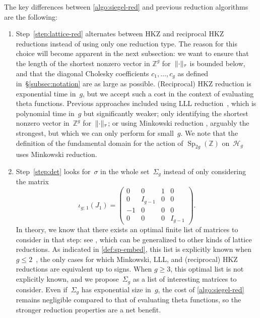 \documentclass[12pt,oneside]{amsart}
\numberwithin{equation}{section}
\theoremstyle{definition}
\newcommand{\Z}{\mathbb{Z}}
\newcommand{\Half}{\mathcal{H}}
\newcommand{\embedsp}[2]{\iota_{#1;\,#2}}
\DeclareMathOperator{\Sp}{Sp}
\DeclarePairedDelimiter{\norm}{\|}{\|}
\begin{document}
The key differences between \cref{algo:siegel-red} and previous reduction
algorithms are the following:
\begin{enumerate}
\item Step~\eqref{step:lattice-red} alternates between HKZ and reciprocal HKZ
  reductions instead of using only one reduction type. The reason for this
  choice will become apparent in the next subsection: we want to ensure that
  the length of the shortest nonzero vector in $\mathbb{Z}^g$
  for~$\norm{\cdot}_\tau$ is bounded below, and that the diagonal Cholesky
  coefficients $c_1,\ldots,c_g$ as defined in~§\ref{subsec:notation} are as
  large as possible. (Reciprocal) HKZ reduction is exponential time in~$g$, but
  we accept such a cost in the context of evaluating theta functions. Previous
  approaches included using LLL
  reduction~\cite{lenstraFactoringPolynomialsRational1982}, which is polynomial
  time in~$g$ but significantly weaker; only identifying the shortest nonzero
  vector in~$\Z^g$ for~$\norm{\cdot}_\tau$; or using Minkowski reduction
  \cite{minkowskiDiskontinuitatsbereichFurArithmetische1905}, arguably the
  strongest, but which we can only perform for small~$g$. We note that the
  definition of the fundamental domain for the action of $\Sp_{2g}(\Z)$
  on~$\Half_g$ uses Minkowski reduction.

\item Step~\eqref{step:det} looks for~$\sigma$ in the whole set~$\Sigma_g$
  instead of only considering the matrix
  \begin{equation}
    \label{eq:one-gammap}
    \embedsp{g}{1}(J_1) =
    \begin{pmatrix}
      0 & 0 & 1 & 0 \\
      0 & I_{g-1} & 0 & 0\\
      -1 & 0 & 0 & 0\\
      0 & 0 & 0 & I_{g-1}
    \end{pmatrix}.
  \end{equation}
  In theory, we know that there exists an optimal finite list of matrices to
  consider in that step: see \cite[Thm.~2
  p.\,34]{klingenIntroductoryLecturesIegel1990}, which can be generalized to
  other kinds of lattice reductions. As indicated in \cref{def:sp-embed}, this
  list is explicitly known
  when~$g\leq 2$~\cite{gottschlingExpliziteBestimmungRandflaechen1959}, the
  only cases for which Minkowski, LLL, and (reciprocal) HKZ reductions are
  equivalent up to signs. When $g\geq 3$, this optimal list is not explicitly
  known, and we propose~$\Sigma_g$ as a list of interesting matrices to
  consider. Even if~$\Sigma_g$ has exponential size in~$g$, the cost of
  \cref{algo:siegel-red} remains negligible compared to that of evaluating
  theta functions, so the stronger reduction properties are a net benefit.
\end{enumerate}
\end{document}
